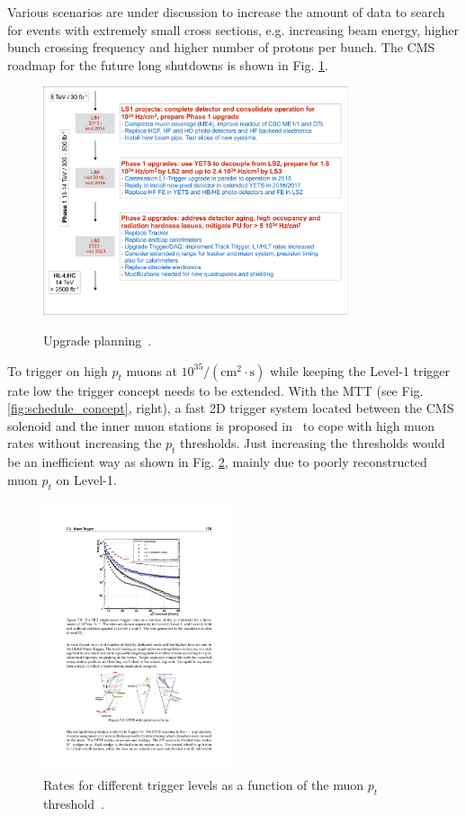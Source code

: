 Various scenarios are under discussion to increase the amount of data to search for events with extremely small cross sections, e.g. increasing beam energy, higher bunch 
crossing frequency and higher number of protons per bunch. The CMS roadmap for the future long shutdowns is shown in Fig. \ref{fig:upgrade_planning}.
\begin{figure}[htbp]
\centering
\includegraphics[width=0.8\textwidth]{Figures/pooth/upgrade_planning.pdf}\\
\caption{Upgrade planning~\cite{upgrade_planning}.} 
\label{fig:upgrade_planning}
\end{figure}

To trigger on high $p_t$ muons at $10^{35}/(\mathrm{cm}^2 \cdot\mathrm{s})$ while keeping the Level-1 trigger rate low the trigger concept needs to be extended. With the MTT (see 
Fig. \ref{fig:schedule_concept}, right), a fast 2D trigger system located between the CMS solenoid and the inner muon stations is proposed in~\cite{mtt_concept} to cope with high 
muon rates without increasing the $p_t$ thresholds. Just increasing the thresholds would be an inefficient way as shown in Fig. \ref{fig:pt_threshold}, mainly due to poorly 
reconstructed muon $p_t$ on Level-1. 
\begin{figure}[htbp]
\centering
\includegraphics[width=0.5\textwidth]{Figures/pooth/pt_threshold.pdf}
\caption{Rates for different trigger levels as a function of the muon $p_t$ threshold~\cite{pt_threshold}.}
\label{fig:pt_threshold}
\end{figure}

